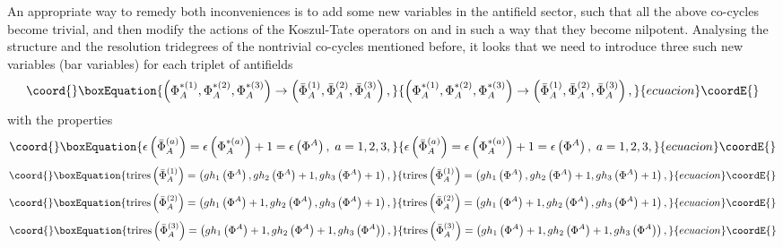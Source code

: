 \documentclass[a4paper,12pt]{article}
\begin{document}
An appropriate way to remedy both inconveniences is to add some new
variables in the antifield sector, such that all the above co-cycles become
trivial, and then modify the actions of the Koszul-Tate operators on \coordHE{} and \coordHE{} in such a way
that they become nilpotent. Analysing the structure and the resolution
tridegrees of the nontrivial co-cycles mentioned before, it looks that we
need to introduce three such new variables (bar variables) for each triplet
of antifields 
\begin{equation}\coord{}\boxEquation{
\left( \Phi _{A}^{*(1)},\Phi _{A}^{*(2)},\Phi _{A}^{*(3)}\right) \rightarrow
\left( \bar{\Phi}_{A}^{(1)},\bar{\Phi}_{A}^{(2)},\bar{\Phi}_{A}^{(3)}\right)
,  \label{sp3.36}
}{
\left( \Phi _{A}^{*(1)},\Phi _{A}^{*(2)},\Phi _{A}^{*(3)}\right) \rightarrow
\left( \bar{\Phi}_{A}^{(1)},\bar{\Phi}_{A}^{(2)},\bar{\Phi}_{A}^{(3)}\right)
,  }{ecuacion}\coordE{}\end{equation}
with the properties 
\begin{equation}\coord{}\boxEquation{
\epsilon \left( \bar{\Phi}_{A}^{(a)}\right) =\epsilon \left( \Phi
_{A}^{*(a)}\right) +1=\epsilon \left( \Phi ^{A}\right) ,\;a=1,2,3,
\label{sp3.37}
}{
\epsilon \left( \bar{\Phi}_{A}^{(a)}\right) =\epsilon \left( \Phi
_{A}^{*(a)}\right) +1=\epsilon \left( \Phi ^{A}\right) ,\;a=1,2,3,
}{ecuacion}\coordE{}\end{equation}
\begin{equation}\coord{}\boxEquation{
\mathrm{trires}\left( \bar{\Phi}_{A}^{(1)}\right) =\left( gh_{1}\left( \Phi
^{A}\right) ,gh_{2}\left( \Phi ^{A}\right) +1,gh_{3}\left( \Phi ^{A}\right)
+1\right) ,  \label{sp3.38}
}{
\mathrm{trires}\left( \bar{\Phi}_{A}^{(1)}\right) =\left( gh_{1}\left( \Phi
^{A}\right) ,gh_{2}\left( \Phi ^{A}\right) +1,gh_{3}\left( \Phi ^{A}\right)
+1\right) ,  }{ecuacion}\coordE{}\end{equation}
\begin{equation}\coord{}\boxEquation{
\mathrm{trires}\left( \bar{\Phi}_{A}^{(2)}\right) =\left( gh_{1}\left( \Phi
^{A}\right) +1,gh_{2}\left( \Phi ^{A}\right) ,gh_{3}\left( \Phi ^{A}\right)
+1\right) ,  \label{sp3.39}
}{
\mathrm{trires}\left( \bar{\Phi}_{A}^{(2)}\right) =\left( gh_{1}\left( \Phi
^{A}\right) +1,gh_{2}\left( \Phi ^{A}\right) ,gh_{3}\left( \Phi ^{A}\right)
+1\right) ,  }{ecuacion}\coordE{}\end{equation}
\begin{equation}\coord{}\boxEquation{
\mathrm{trires}\left( \bar{\Phi}_{A}^{(3)}\right) =\left( gh_{1}\left( \Phi
^{A}\right) +1,gh_{2}\left( \Phi ^{A}\right) +1,gh_{3}\left( \Phi
^{A}\right) \right) ,  \label{sp3.40}
}{
\mathrm{trires}\left( \bar{\Phi}_{A}^{(3)}\right) =\left( gh_{1}\left( \Phi
^{A}\right) +1,gh_{2}\left( \Phi ^{A}\right) +1,gh_{3}\left( \Phi
^{A}\right) \right) ,  }{ecuacion}\coordE{}\end{equation}
\end{document}
